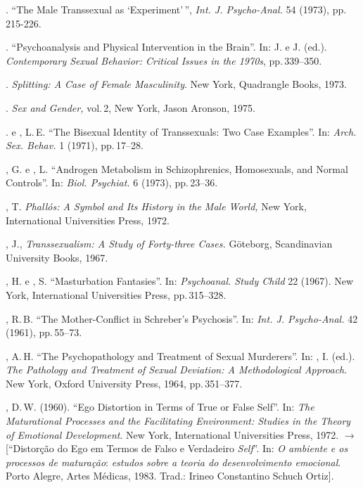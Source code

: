 \begin{bibliohedra}
. ``The Male Transsexual as `Experiment'\,'', \textit{Int. J.
Psycho-Anal. }54 (1973), pp.\,215-226.

. ``Psychoanalysis and Physical Intervention in
the Brain''. In:  J. e  J. (ed.). \textit{ Contemporary Sexual Behavior:
Critical Issues in the 1970s}, pp.\,339--350.

. \textit{Splitting: A Case of Female Masculinity}. New York,
Quadrangle Books, 1973.

. \textit{Sex and Gender, }vol.\,2, New York, Jason Aronson, 1975.

. e , L.\,E. ``The Bisexual Identity of
Transsexuals: Two Case Examples''. In: \textit{Arch. Sex. Behav. }1
(1971), pp.\,17--28.

, G. e , L. ``Androgen Metabolism in
Schizophrenics, Homosexuals, and Normal Controls''. In: \textit{Biol.
Psychiat. }6 (1973), pp.\,23--36.

, T. \textit{Phallós: A Symbol and Its History in the Male World,
}New York, International Universities Press, 1972.

, J., \textit{Transsexualism: A Study of Forty-three Cases. }Göteborg,
Scandinavian University Books, 1967.

, H. e , S. ``Masturbation Fantasies''. In:
\textit{Psychoanal. Study Child }22 (1967). New York, International
Universities Press, pp.\,315--328.

, R.\,B. ``The Mother-Conflict in
Schreber's Psychosis''. In: \textit{Int. J. Psycho-Anal.
} 42 (1961), pp.\,55--73.

, A.\,H. ``The Psychopathology and Treatment of Sexual
Murderers''. In: , I. (ed.). \textit{The Pathology and Treatment of Sexual
Deviation: A Methodological Approach}. New York, Oxford
University Press, 1964, pp.\,351--377.

, D.\,W. (1960). ``Ego Distortion in Terms of True or
False Self''. In: \textit{The Maturational Processes and the
Facilitating Environment: Studies in the Theory of Emotional Development}. New
York, International Universities Press, 1972. {$\bm{\rightarrow}$} [“Distorção do Ego em Termos de
Falso e Verdadeiro \textit{Self}”. In: \textit{O ambiente e os processos
de maturação}: \textit{estudos sobre a teoria do desenvolvimento emocional}. Porto
Alegre, Artes Médicas, 1983. Trad.: Irineo Constantino Schuch Ortiz].

\end{bibliohedra}

\cleardoublepage



